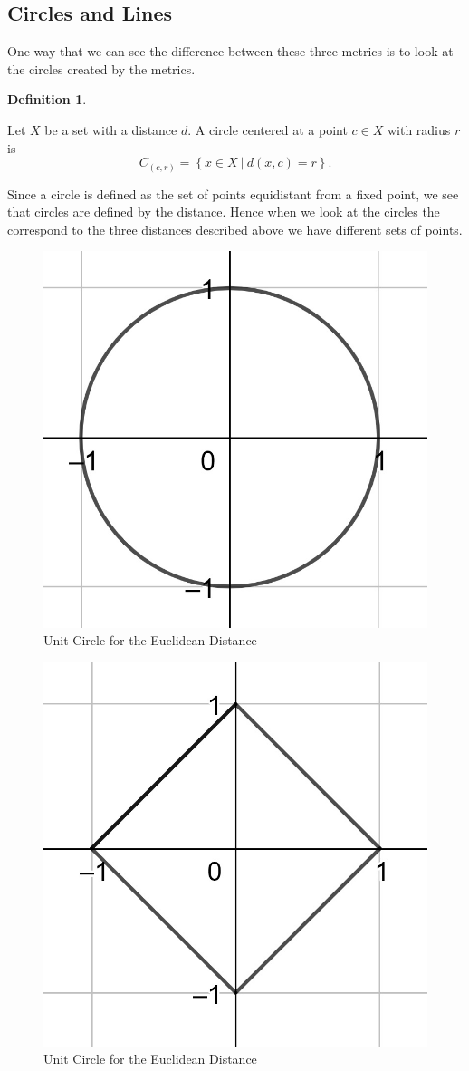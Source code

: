 \documentclass[
]{book}
\theoremstyle{definition}
\newtheorem{definition}{Definition}[chapter]
\theoremstyle{definition}
\theoremstyle{definition}
\theoremstyle{definition}
\theoremstyle{remark}
\begin{document}
\hypertarget{circles-and-lines}{%
\subsection{Circles and Lines}\label{circles-and-lines}}

One way that we can see the difference between these three metrics is to look at the circles created by the metrics.

\begin{definition}
\protect\hypertarget{def:unlabeled-div-212}{}\label{def:unlabeled-div-212}

Let \(X\) be a set with a distance \(d\). A circle centered at a point \(c\in X\) with radius \(r\) is
\[C_{(c,r)} = \left\{ x\in X \: \vert \: d(x,c)=r\right\}.\]

\end{definition}

Since a circle is defined as the set of points equidistant from a fixed point, we see that circles are defined by the distance. Hence when we look at the circles the correspond to the three distances described above we have different sets of points.

\begin{figure}

{\centering \includegraphics[width=0.3\linewidth]{images/circle-Euclidean} 

}

\caption{Unit Circle for the Euclidean Distance}\label{fig:Euclidean-circle}
\end{figure}

\begin{figure}

{\centering \includegraphics[width=0.3\linewidth]{images/circle-taxi} 

}

\caption{Unit Circle for the Euclidean Distance}\label{fig:taxi-circle}
\end{figure}
\end{document}
